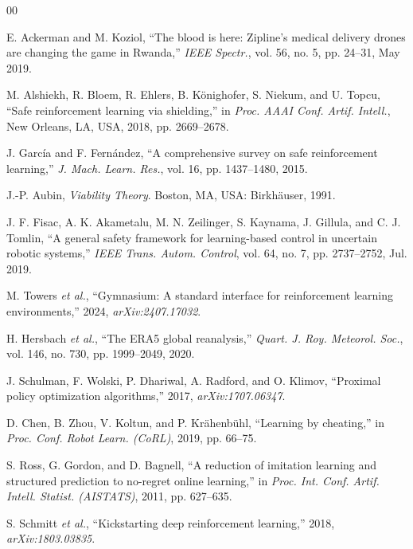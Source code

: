 \documentclass{ieeeaccess}
\begin{document}
\begin{thebibliography}{00}

 E. Ackerman and M. Koziol, ``The blood is here: Zipline's medical delivery drones are changing the game in Rwanda,'' \emph{IEEE Spectr.}, vol. 56, no. 5, pp. 24--31, May 2019.

 M. Alshiekh, R. Bloem, R. Ehlers, B. K\"{o}nighofer, S. Niekum, and U. Topcu, ``Safe reinforcement learning via shielding,'' in \emph{Proc. AAAI Conf. Artif. Intell.}, New Orleans, LA, USA, 2018, pp. 2669--2678.

 J. Garc\'{i}a and F. Fern\'{a}ndez, ``A comprehensive survey on safe reinforcement learning,'' \emph{J. Mach. Learn. Res.}, vol. 16, pp. 1437--1480, 2015.

 J.-P. Aubin, \emph{Viability Theory}. Boston, MA, USA: Birkh\"{a}user, 1991.

 J. F. Fisac, A. K. Akametalu, M. N. Zeilinger, S. Kaynama, J. Gillula, and C. J. Tomlin, ``A general safety framework for learning-based control in uncertain robotic systems,'' \emph{IEEE Trans. Autom. Control}, vol. 64, no. 7, pp. 2737--2752, Jul. 2019.

 M. Towers \emph{et al.}, ``Gymnasium: A standard interface for reinforcement learning environments,'' 2024, \emph{arXiv:2407.17032}.

 H. Hersbach \emph{et al.}, ``The ERA5 global reanalysis,'' \emph{Quart. J. Roy. Meteorol. Soc.}, vol. 146, no. 730, pp. 1999--2049, 2020.

 J. Schulman, F. Wolski, P. Dhariwal, A. Radford, and O. Klimov, ``Proximal policy optimization algorithms,'' 2017, \emph{arXiv:1707.06347}.

 D. Chen, B. Zhou, V. Koltun, and P. Kr\"{a}henb\"{u}hl, ``Learning by cheating,'' in \emph{Proc. Conf. Robot Learn. (CoRL)}, 2019, pp. 66--75.

 S. Ross, G. Gordon, and D. Bagnell, ``A reduction of imitation learning and structured prediction to no-regret online learning,'' in \emph{Proc. Int. Conf. Artif. Intell. Statist. (AISTATS)}, 2011, pp. 627--635.

 S. Schmitt \emph{et al.}, ``Kickstarting deep reinforcement learning,'' 2018, \emph{arXiv:1803.03835}.


\end{thebibliography}
\end{document}
